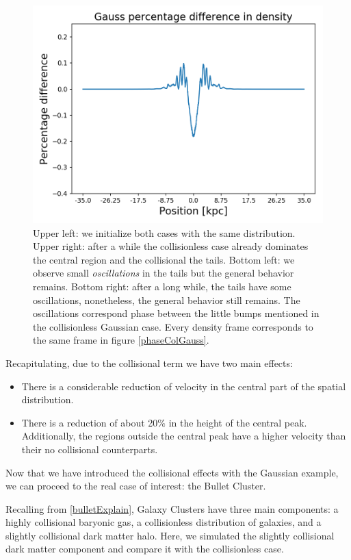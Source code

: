 \begin{figure}[h!]
    \includegraphics[scale=0.45]{imag/cGaussD62.png}
    \caption{Upper left: we initialize both cases with the same distribution. Upper right: after a while the collisionless case already dominates the central region and the collisional the tails. Bottom left: we observe small \emph{oscillations} in the tails but the general behavior remains. Bottom right: after a long while, the tails have some oscillations, nonetheless, the general behavior still remains. The oscillations correspond phase between the little bumps mentioned in the collisionless Gaussian case. Every density frame corresponds to the same frame in figure \ref{phaseColGauss}.}
    \label{densColGauss}
\end{figure}

Recapitulating, due to the collisional term we have two main effects:
\begin{itemize}
\item There is a considerable reduction of velocity in the central part of the spatial distribution.
\item There is a reduction of about 20$\%$ in the height of the central peak. Additionally, the regions outside the central peak have a higher velocity than their no collisional counterparts.
\end{itemize}

Now that we have introduced the collisional effects with the Gaussian example, we can proceed to the real case of interest: the Bullet Cluster. 

Recalling from \ref{bulletExplain}, Galaxy Clusters have three main components: a highly collisional baryonic gas, a collisionless distribution of galaxies, and a slightly collisional dark matter halo. Here, we simulated the slightly collisional dark matter component and compare it with the collisionless case.%

